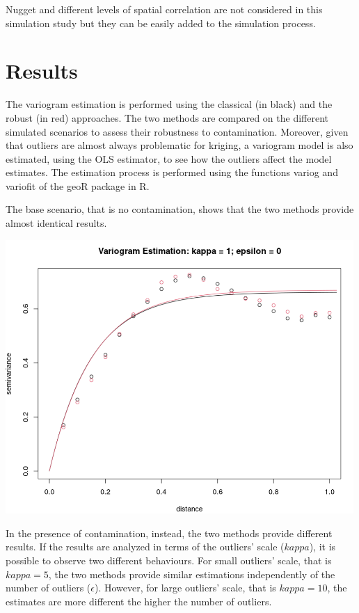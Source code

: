 \documentclass[
  12pt]{article}
\begin{document}
Nugget and different levels of spatial correlation are not considered in
this simulation study but they can be easily added to the simulation
process.

\section{Results}\label{results}

The variogram estimation is performed using the classical (in black) and
the robust (in red) approaches. The two methods are compared on the
different simulated scenarios to assess their robustness to
contamination. Moreover, given that outliers are almost always
problematic for kriging, a variogram model is also estimated, using the
OLS estimator, to see how the outliers affect the model estimates. The
estimation process is performed using the functions variog and variofit
of the geoR package in R.

The base scenario, that is no contamination, shows that the two methods
provide almost identical results.

\begin{center}
\includegraphics[width=5.20833in,height=\textheight]{img/variog_grf_ols.png}
\end{center}

In the presence of contamination, instead, the two methods provide
different results. If the results are analyzed in terms of the outliers'
scale (\(kappa\)), it is possible to observe two different behaviours.
For small outliers' scale, that is \(kappa = 5\), the two methods
provide similar estimations independently of the number of outliers
(\(\epsilon\)). However, for large outliers' scale, that is
\(kappa = 10\), the estimates are more different the higher the number
of outliers.
\end{document}
